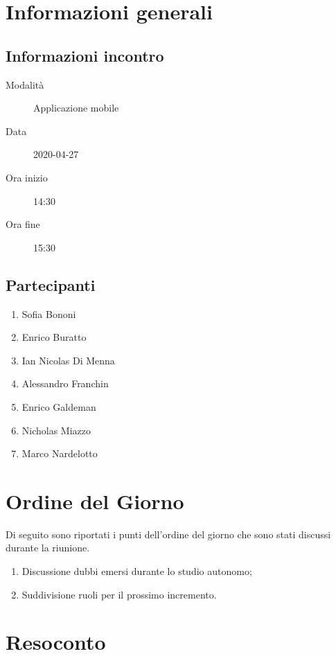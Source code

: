 \documentclass{article}
\begin{document}


\section{Informazioni generali}%
\label{sec:informazioni_generali}

\subsection{Informazioni incontro}%
\label{sub:informazioni_incontro}

\begin{description}
  \item[Modalità] Applicazione mobile 
  \item[Data] 2020-04-27
  \item[Ora inizio] 14:30
  \item[Ora fine] 15:30
\end{description}

\subsection{Partecipanti}%
\label{sub:partecipanti}

\begin{enumerate}
  \item Sofia Bononi
  \item Enrico Buratto
  \item Ian Nicolas Di Menna
  \item Alessandro Franchin
  \item Enrico Galdeman
  \item Nicholas Miazzo
  \item Marco Nardelotto
\end{enumerate}

\section{Ordine del Giorno}%
\label{ordine_del_giorno}
Di seguito sono riportati i punti dell'ordine del giorno che sono stati discussi durante la riunione.
\begin{enumerate}
  \item Discussione dubbi emersi durante lo studio autonomo;
  \item Suddivisione ruoli per il prossimo incremento.
\end{enumerate}

\section{Resoconto}%
\label{resoconto}
\end{document}
